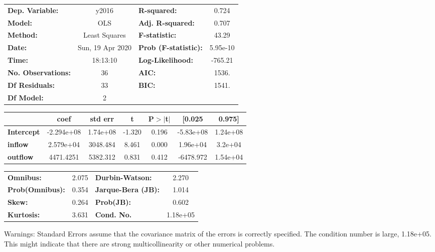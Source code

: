 \begin{center}
\begin{tabular}{lclc}
\toprule
\textbf{Dep. Variable:}    &      y2016       & \textbf{  R-squared:         } &     0.724   \\
\textbf{Model:}            &       OLS        & \textbf{  Adj. R-squared:    } &     0.707   \\
\textbf{Method:}           &  Least Squares   & \textbf{  F-statistic:       } &     43.29   \\
\textbf{Date:}             & Sun, 19 Apr 2020 & \textbf{  Prob (F-statistic):} &  5.95e-10   \\
\textbf{Time:}             &     18:13:10     & \textbf{  Log-Likelihood:    } &   -765.21   \\
\textbf{No. Observations:} &          36      & \textbf{  AIC:               } &     1536.   \\
\textbf{Df Residuals:}     &          33      & \textbf{  BIC:               } &     1541.   \\
\textbf{Df Model:}         &           2      & \textbf{                     } &             \\
\bottomrule
\end{tabular}
\begin{tabular}{lcccccc}
                   & \textbf{coef} & \textbf{std err} & \textbf{t} & \textbf{P$> |$t$|$} & \textbf{[0.025} & \textbf{0.975]}  \\
\midrule
\textbf{Intercept} &   -2.294e+08  &     1.74e+08     &    -1.320  &         0.196        &    -5.83e+08    &     1.24e+08     \\
\textbf{inflow}    &    2.579e+04  &     3048.484     &     8.461  &         0.000        &     1.96e+04    &      3.2e+04     \\
\textbf{outflow}   &    4471.4251  &     5382.312     &     0.831  &         0.412        &    -6478.972    &     1.54e+04     \\
\bottomrule
\end{tabular}
\begin{tabular}{lclc}
\textbf{Omnibus:}       &  2.075 & \textbf{  Durbin-Watson:     } &    2.270  \\
\textbf{Prob(Omnibus):} &  0.354 & \textbf{  Jarque-Bera (JB):  } &    1.014  \\
\textbf{Skew:}          &  0.264 & \textbf{  Prob(JB):          } &    0.602  \\
\textbf{Kurtosis:}      &  3.631 & \textbf{  Cond. No.          } & 1.18e+05  \\
\bottomrule
\end{tabular}
\end{center}

Warnings: \newline
 [1] Standard Errors assume that the covariance matrix of the errors is correctly specified. \newline
 [2] The condition number is large, 1.18e+05. This might indicate that there are \newline
 strong multicollinearity or other numerical problems.
